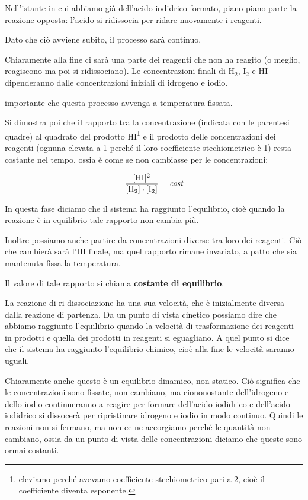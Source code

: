 Nell'istante in cui abbiamo già dell'acido iodidrico formato, piano piano parte la reazione opposta: l'acido si ridissocia per ridare nuovamente i reagenti.

Dato che ciò avviene subito, il processo sarà continuo.

Chiaramente alla fine ci sarà una parte dei reagenti che non ha reagito (o meglio, reagiscono ma poi si ridissociano). Le concentrazioni finali di H$_2$, I$_2$ e HI dipenderanno dalle concentrazioni iniziali di idrogeno e iodio.

\E importante che questa processo avvenga a temperatura fissata.

Si dimostra poi che il rapporto tra la concentrazione (indicata con le parentesi quadre) al quadrato del prodotto HI\footnote{eleviamo perché avevamo coefficiente stechiometrico pari a 2, cioè il coefficiente diventa esponente.} e il prodotto delle concentrazioni dei reagenti (ognuna elevata a 1 perché il loro coefficiente stechiometrico è 1) resta costante nel tempo, ossia è come se non cambiasse per le concentrazioni:

$$\rm \frac{[HI]^2}{[H_2] \cdot [I_2]}=\textit{cost}$$

In questa fase diciamo che il sistema ha raggiunto l'equilibrio, cioè quando la reazione è in equilibrio tale rapporto non cambia più.

Inoltre possiamo anche partire da concentrazioni diverse tra loro dei reagenti. Ciò che cambierà sarà l'HI finale, ma quel rapporto rimane invariato, a patto che sia mantenuta fissa la temperatura.

Il valore di tale rapporto si chiama \textbf{costante di equilibrio}.

La reazione di ri-dissociazione ha una sua velocità, che è inizialmente diversa dalla reazione di partenza. Da un punto di vista cinetico possiamo dire che abbiamo raggiunto l'equilibrio quando la velocità di trasformazione dei reagenti in prodotti e quella dei prodotti in reagenti si eguagliano. A quel punto si dice che il sistema ha raggiunto l'equilibrio chimico, cioè alla fine le velocità saranno uguali.

Chiaramente anche questo è un equilibrio dinamico, non statico. Ciò significa che le concentrazioni sono fissate, non cambiano, ma ciononostante dell'idrogeno e dello iodio continueranno a reagire per formare dell'acido iodidrico e dell'acido iodidrico si dissocerà per ripristinare idrogeno e iodio in modo continuo. Quindi le reazioni non si fermano, ma non ce ne accorgiamo perché le quantità non cambiano, ossia da un punto di vista delle concentrazioni diciamo che queste sono ormai costanti.

